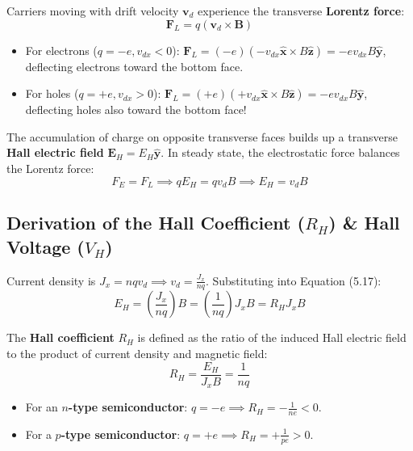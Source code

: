 Carriers moving with drift velocity $\mathbf{v}_d$ experience the transverse \textbf{Lorentz force}:
\begin{equation}
    \mathbf{F}_L = q(\mathbf{v}_d \times \mathbf{B})
\end{equation}
\begin{itemize}
    \item For electrons ($q = -e, v_{dx} < 0$): $\mathbf{F}_L = (-e)(-v_{dx}\hat{\mathbf{x}} \times B\hat{\mathbf{z}}) = -e v_{dx} B \hat{\mathbf{y}}$, deflecting electrons toward the bottom face.
    \item For holes ($q = +e, v_{dx} > 0$): $\mathbf{F}_L = (+e)(+v_{dx}\hat{\mathbf{x}} \times B\hat{\mathbf{z}}) = -e v_{dx} B \hat{\mathbf{y}}$, deflecting holes also toward the bottom face!
\end{itemize}
The accumulation of charge on opposite transverse faces builds up a transverse \textbf{Hall electric field} $\mathbf{E}_H = E_H \hat{\mathbf{y}}$. In steady state, the electrostatic force balances the Lorentz force:
\begin{equation}
    F_E = F_L \implies q E_H = q v_d B \implies E_H = v_d B
\end{equation}

\subsection{Derivation of the Hall Coefficient (\texorpdfstring{$R_H$}{RH}) \& Hall Voltage (\texorpdfstring{$V_H$}{VH})}
Current density is $J_x = n q v_d \implies v_d = \frac{J_x}{n q}$. Substituting into Equation (5.17):
\begin{equation}
    E_H = \left(\frac{J_x}{n q}\right)B = \left(\frac{1}{n q}\right) J_x B = R_H J_x B
\end{equation}

\begin{definition}
The \textbf{Hall coefficient} $R_H$ is defined as the ratio of the induced Hall electric field to the product of current density and magnetic field:
\begin{equation}
    R_H = \frac{E_H}{J_x B} = \frac{1}{n q}
\end{equation}
\begin{itemize}
    \item For an \textbf{$n$-type semiconductor}: $q = -e \implies R_H = -\frac{1}{n e} < 0$.
    \item For a \textbf{$p$-type semiconductor}: $q = +e \implies R_H = +\frac{1}{p e} > 0$.
\end{itemize}
\end{definition}

